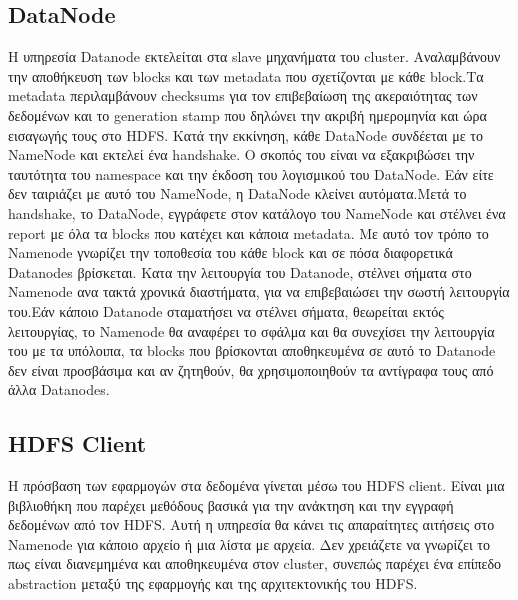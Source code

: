 \subsection{DataNode}
Η υπηρεσία Datanode εκτελείται στα slave μηχανήματα του cluster. Αναλαμβάνουν την αποθήκευση των blocks και των metadata που σχετίζονται με κάθε block.Τα metadata περιλαμβάνουν checksums για τον επιβεβαίωση της ακεραιότητας των δεδομένων και το generation stamp που δηλώνει την ακριβή ημερομηνία και ώρα εισαγωγής τους στο HDFS. Κατά την εκκίνηση, κάθε DataNode συνδέεται με το NameNode και εκτελεί ένα handshake. Ο σκοπός του είναι να εξακριβώσει την ταυτότητα του namespace και την έκδοση του λογισμικού του DataNode. Εάν είτε δεν ταιριάζει με αυτό του NameNode, η DataNode κλείνει αυτόματα.Μετά το handshake, το DataNode, εγγράφετε στον κατάλογο του NameNode και στέλνει ένα report με όλα τα blocks που κατέχει και κάποια metadata. Με αυτό τον τρόπο το Namenode γνωρίζει την τοποθεσία του κάθε block και σε πόσα διαφορετικά Datanodes βρίσκεται. Κατα την λειτουργία του Datanode, στέλνει σήματα στο Namenode ανα τακτά χρονικά διαστήματα, για να επιβεβαιώσει την σωστή λειτουργία του.Εάν κάποιο Datanode σταματήσει να στέλνει σήματα, θεωρείται εκτός λειτουργίας, το Namenode θα αναφέρει το σφάλμα και θα συνεχίσει την λειτουργία του με τα υπόλοιπα, τα blocks που βρίσκονται αποθηκευμένα σε αυτό το Datanode δεν είναι προσβάσιμα και αν ζητηθούν, θα χρησιμοποιηθούν τα αντίγραφα τους από άλλα Datanodes.

\subsection{HDFS Client}
Η πρόσβαση των εφαρμογών στα δεδομένα γίνεται μέσω του HDFS client. Είναι μια βιβλιοθήκη που παρέχει μεθόδους βασικά για την ανάκτηση και την εγγραφή δεδομένων από τον HDFS. Αυτή η υπηρεσία θα κάνει τις απαραίτητες αιτήσεις στο Namenode για κάποιο αρχείο ή μια λίστα με αρχεία. Δεν χρειάζετε να γνωρίζει το πως είναι διανεμημένα και αποθηκευμένα στον cluster, συνεπώς παρέχει ένα επίπεδο abstraction μεταξύ της εφαρμογής και της αρχιτεκτονικής του HDFS.
